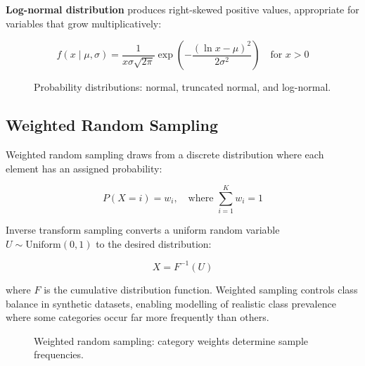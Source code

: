 \documentclass[10pt,a4paper]{article}
\begin{document}
\textbf{Log-normal distribution} produces right-skewed positive values, appropriate for variables that grow multiplicatively:

\begin{equation}
f(x \mid \mu, \sigma) = \frac{1}{x\sigma\sqrt{2\pi}} \exp\left(-\frac{(\ln x - \mu)^2}{2\sigma^2}\right) \quad \text{for } x > 0
\label{eq:lognormal}
\end{equation}

\begin{figure}[H]
    \centering
    \caption{Probability distributions: normal, truncated normal, and log-normal.}
    \label{fig:distributions}
\end{figure}

\subsection{Weighted Random Sampling}
\label{sec:weighted-sampling}

Weighted random sampling draws from a discrete distribution where each element has an assigned probability:

\begin{equation}
P(X = i) = w_i, \quad \text{where } \sum_{i=1}^{K} w_i = 1
\label{eq:weighted-sampling}
\end{equation}

Inverse transform sampling converts a uniform random variable $U \sim \text{Uniform}(0, 1)$ to the desired distribution:

\begin{equation}
X = F^{-1}(U)
\label{eq:inverse-transform}
\end{equation}

where $F$ is the cumulative distribution function. Weighted sampling controls class balance in synthetic datasets, enabling modelling of realistic class prevalence where some categories occur far more frequently than others.

\begin{figure}[H]
    \centering
    \caption{Weighted random sampling: category weights determine sample frequencies.}
    \label{fig:weighted-sampling}
\end{figure}
\end{document}
